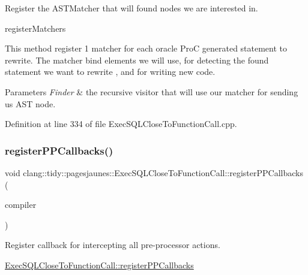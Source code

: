 Register the A\+S\+T\+Matcher that will found nodes we are interested in. 

register\+Matchers

This method register 1 matcher for each oracle ProC generated statement to rewrite. The matcher bind elements we will use, for detecting the found statement we want to rewrite , and for writing new code.


\begin{DoxyParams}{Parameters}
{\em Finder} & the recursive visitor that will use our matcher for sending us A\+ST node. \\
\hline
\end{DoxyParams}


Definition at line 334 of file Exec\+S\+Q\+L\+Close\+To\+Function\+Call.\+cpp.

\mbox{\label{classclang_1_1tidy_1_1pagesjaunes_1_1_exec_s_q_l_close_to_function_call_a3d8238ee00e0c6ab1bfc0e9d486f8627}} 
\subsubsection{\texorpdfstring{register\+P\+P\+Callbacks()}{registerPPCallbacks()}}
{\footnotesize\ttfamily void clang\+::tidy\+::pagesjaunes\+::\+Exec\+S\+Q\+L\+Close\+To\+Function\+Call\+::register\+P\+P\+Callbacks (\begin{DoxyParamCaption}\item[{Compiler\+Instance \&}]{compiler }\end{DoxyParamCaption})\hspace{0.3cm}{\ttfamily [override]}}



Register callback for intercepting all pre-\/processor actions. 

\hyperlink{classclang_1_1tidy_1_1pagesjaunes_1_1_exec_s_q_l_close_to_function_call_a3d8238ee00e0c6ab1bfc0e9d486f8627}{Exec\+S\+Q\+L\+Close\+To\+Function\+Call\+::register\+P\+P\+Callbacks}

